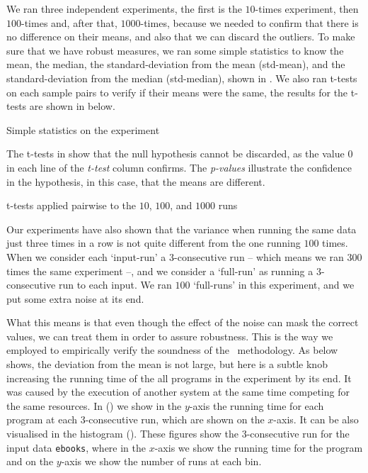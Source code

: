 We ran three independent experiments, the first is the $10$-times experiment, then $100$-times and, after that, $1000$-times, because we needed to confirm that there is no difference on their means, and also that we can discard the outliers. To make sure that we have robust measures, we ran some simple statistics to know the mean, the median, the standard-deviation from the mean (std-mean), and the standard-deviation from the median (std-median), shown in . We also ran t-tests on each sample pairs to verify if their means were the same, the results for the t-tests are shown in  below.

\begin{table}
  \centering
  \begin{tiny}
  
  \end{tiny}
  \caption{Simple statistics on the experiment}
  \label{tab:robustTest}
\end{table}

The t-tests in  show that the null hypothesis cannot be discarded, as the value $0$ in each line of the \emph{t-test} column confirms. The \emph{p-values} illustrate the confidence in the hypothesis, in this case, that the means are different.

\begin{table}
  \centering
  \begin{tiny}
  
  \end{tiny}
  \caption{t-tests applied pairwise to the $10$, $100$, and $1000$ runs}
  \label{tab:ttest}
\end{table}

Our experiments have also shown that the variance when running the same data just three times in a row is not quite different from the one running $100$ times. When we consider each `input-run' a $3$-consecutive run -- which means we ran $300$ times the same experiment --, and we consider a `full-run' as running a $3$-consecutive run to each input. We ran $100$ `full-runs' in this experiment, and we put some extra noise at its end.

What this means is that even though the effect of the noise can mask the correct values, we can treat them in order to assure robustness. This is the way we employed to empirically verify the soundness of the \CP\ methodology. As  below shows, the deviation from the mean is not large, but here is a subtle knob increasing the running time of the all programs in the experiment by its end. It was caused by the execution of another system at the same time competing for the same resources. In () we show in the $y$-axis the running time for each program at each 3-consecutive run, which are shown on the $x$-axis. It can be also visualised in the histogram (). These figures show the $3$-consecutive run for the input data {\tt ebooks}, where in the $x$-axis we show the running time for the program and on the $y$-axis we show the number of runs at each bin.

